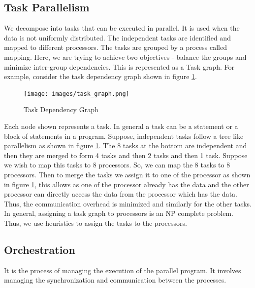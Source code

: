 \documentclass[12pt]{book}
\begin{document}
\subsection{Task Parallelism}
We decompose into tasks that can be executed in parallel. It is used when the data is not uniformly distributed.
The independent tasks are identified and mapped to different processors. The tasks are grouped by a process called mapping. 
Here, we are trying to achieve two objectives - balance the groups and minimize inter-group dependencies.
This is represented as a Task graph. For example, consider the task dependency graph shown in figure 
\ref{fig:task_graph}.
\begin{figure}[H]
    \centering
    \texttt{[image: images/task\_graph.png]}
    \caption{Task Dependency Graph}
    \label{fig:task_graph}
\end{figure}
Each node shown represents a task. In general a task can be a statement or a block of statements in a program. 
Suppose, independent tasks follow a tree like parallelism as shown in figure \ref{fig:task_graph}.
The 8 tasks at the bottom are independent and then they are merged to form 4 tasks and then 2 tasks and then 1 task.
Suppose we wish to map this tasks to 8 processors. So, we can map the 8 tasks to 8 processors. Then to merge the tasks we assign it to one of the 
processor as shown in figure \ref{fig:task_graph}, this allows as one of the processor already has the data and the other processor 
can directly access the data from the processor which has the data. Thus, the communication overhead is minimized and similarly for the other tasks.
In general, assigning a task graph to processors is an NP complete problem. Thus, we use heuristics to assign the tasks to the processors.

\subsection{Orchestration}
It is the process of managing the execution of the parallel program. It involves managing the synchronization and communication between the processes.
\end{document}
